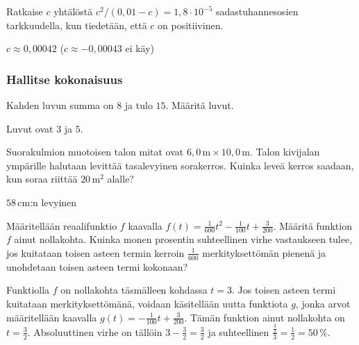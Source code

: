 \begin{tehtavasivu}
\begin{tehtava}
Ratkaise $c$ yhtälöstä $c^2/(0,01-c)=1,8\cdot 10^{-5}$ sadastuhannesosien tarkkuudella, kun tiedetään, että $c$ on positiivinen.
	\begin{vastaus}
	$c\approx 0,00042$ ($c \approx -0,00043$ ei käy)
	\end{vastaus}
\end{tehtava}


\subsubsection*{Hallitse kokonaisuus}

\begin{tehtava}
    Kahden luvun summa on $8$ ja tulo $15$. Määritä luvut.
    \begin{vastaus}
		Luvut ovat $3$ ja $5$.
    \end{vastaus}
\end{tehtava}

\begin{tehtava}
    Suorakulmion muotoisen talon mitat ovat $6,0\,\text{m} \times 10,0$\,m. Talon kivijalan ympärille halutaan levittää tasalevyinen sorakerros. Kuinka leveä kerros saadaan, kun soraa riittää $20$\,m$^2$ alalle?
    \begin{vastaus}
		$58$\,cm:n levyinen
    \end{vastaus}
\end{tehtava}

\begin{tehtava}
    Määritellään reaalifunktio $f$ kaavalla $f(t)=\frac{1}{600}t^2-\frac{1}{100}t+\frac{3}{200}$. Määritä funktion $f$ ainut nollakohta. Kuinka monen prosentin suhteellinen virhe vastaukseen tulee, jos kuitataan toisen asteen termin kerroin $\frac{1}{600}$ merkityksettömän pienenä ja unohdetaan toisen asteen termi kokonaan?
    \begin{vastaus}
Funktiolla $f$ on nollakohta täsmälleen kohdassa $t=3$. Jos toisen asteen termi kuitataan merkityksettömänä, voidaan käsitellään uutta funktiota $g$, jonka arvot määritellään kaavalla $g(t)=-\frac{1}{100}t+\frac{3}{200}$. Tämän funktion ainut nollakohta on $t=\frac{3}{2}$. Absoluuttinen virhe on tällöin $3-\frac{3}{2}=\frac{3}{2}$ ja suhteellinen $\frac{\frac{3}{2}}{3}=\frac{1}{2}=50\,\%$.
    \end{vastaus}
\end{tehtava}


\end{tehtavasivu}
